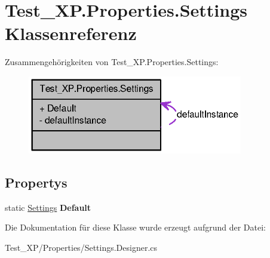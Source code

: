 \hypertarget{class_test___x_p_1_1_properties_1_1_settings}{
\section{Test\_\-XP.Properties.Settings Klassenreferenz}
\label{class_test___x_p_1_1_properties_1_1_settings}
}


Zusammengehörigkeiten von Test\_\-XP.Properties.Settings:\nopagebreak
\begin{figure}[H]
\begin{center}
\leavevmode
\includegraphics[width=266pt]{class_test___x_p_1_1_properties_1_1_settings__coll__graph}
\end{center}
\end{figure}
\subsection*{Propertys}
\begin{DoxyCompactItemize}
\item 
\hypertarget{class_test___x_p_1_1_properties_1_1_settings_a7a5870521771963698d03a258efb4c8e}{
static \hyperlink{class_test___x_p_1_1_properties_1_1_settings}{Settings} {\bfseries Default}}
\label{class_test___x_p_1_1_properties_1_1_settings_a7a5870521771963698d03a258efb4c8e}

\end{DoxyCompactItemize}


Die Dokumentation für diese Klasse wurde erzeugt aufgrund der Datei:\begin{DoxyCompactItemize}
\item 
Test\_\-XP/Properties/Settings.Designer.cs\end{DoxyCompactItemize}
